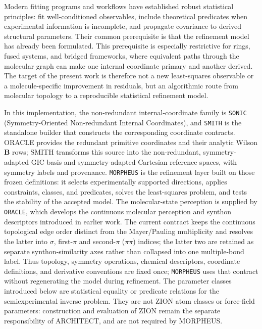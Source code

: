 \documentclass[aip,jcp,reprint,longbibliography,floatfix]{revtex4-2}
\begin{document}
Modern fitting programs and workflows\cite{Mendolicchio2017MSR,KisielPROSPE,Kanzow2025PCCP}
have established robust statistical principles: fit well-conditioned
observables, include theoretical predicates when experimental information is
incomplete, and propagate covariance to derived structural
parameters.\cite{Bartell1975Predicate} Their common prerequisite is that the
refinement model has already been formulated. This prerequisite is especially
restrictive for rings, fused systems, and bridged frameworks, where equivalent
paths through the molecular graph can make one internal coordinate primary and
another derived. The target of the present work is therefore not a new
least-squares observable or a molecule-specific improvement in residuals, but
an algorithmic route from molecular topology to a reproducible statistical
refinement model.

In this implementation, the non-redundant internal-coordinate family is
\texttt{SONIC} (Symmetry-Oriented Non-redundant Internal Coordinates), and
\texttt{SMITH} is the standalone builder that constructs the corresponding
coordinate contracts. ORACLE provides the redundant primitive coordinates and
their analytic Wilson $\mathbf{B}$ rows; SMITH transforms this source into the
non-redundant, symmetry-adapted GIC basis and symmetry-adapted Cartesian
reference spaces, with symmetry labels and provenance. \texttt{MORPHEUS} is the refinement layer built on those
frozen definitions: it selects experimentally supported directions, applies
constraints, classes, and predicates, solves the least-squares problem, and
tests the stability of the accepted model. The molecular-state perception is
supplied by \texttt{ORACLE}, which develops the continuous molecular perception
and synthon descriptors introduced in earlier work.\cite{Lazzari2020Proxima,Lazzari2024SynthonPCS}
The current contract keeps the continuous topological edge order distinct from
the Mayer/Pauling multiplicity and resolves the latter into $\sigma$,
first-$\pi$ and second-$\pi$ ($\pi\pi$) indices; the latter two are retained
as separate synthon-similarity axes rather than collapsed into one
multiple-bond label.
Thus topology, symmetry operations, chemical descriptors, coordinate
definitions, and derivative conventions are fixed once; \texttt{MORPHEUS} uses
that contract without regenerating the model during refinement.
The parameter classes introduced below are statistical equality or predicate
relations for the semiexperimental inverse problem. They are not ZION atom
classes or force-field parameters: construction and evaluation of ZION remain
the separate responsibility of ARCHITECT, and are not required by MORPHEUS.
\end{document}
